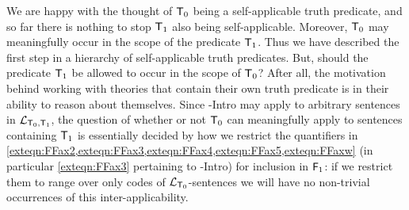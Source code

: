 \documentclass[UKenglish,cleveref,DIV=12]{scrartcl}
\theoremstyle{definition}
\theoremstyle{definition}
\begin{document}

We are happy with the thought of $\mathsf{T}_0$ being a self-applicable truth predicate,
and so far there is nothing to stop $\mathsf{T}_1$ also being self-applicable. Moreover, $\mathsf{T}_0$
may meaningfully occur in the scope of the predicate $\mathsf{T}_1$. Thus we have described the
first step in a hierarchy of self-applicable truth predicates. But, should the
predicate $\mathsf{T}_1$ be allowed to occur in the scope of $\mathsf{T}_0$? After all, the
motivation behind working with theories that contain their own truth predicate
is in their ability to reason about themselves.
Since
-Intro may apply to arbitrary sentences in $\mathcal{L}_{\mathsf{T}_0,\mathsf{T}_1}$, the question
of whether or not $\mathsf{T}_0$ can meaningfully apply to sentences containing $\mathsf{T}_1$
is essentially decided by how we restrict the quantifiers in
\cref{exteqn:FFax2,exteqn:FFax3,exteqn:FFax4,exteqn:FFax5,exteqn:FFaxw} (in
particular \cref{exteqn:FFax3} pertaining to -Intro) for inclusion in
$\mathsf{F}_1$: if we restrict them to range over only codes of $\mathcal{L}_{\mathsf{T}_0}$-sentences we
will have no non-trivial occurrences of this inter-applicability.
\end{document}
